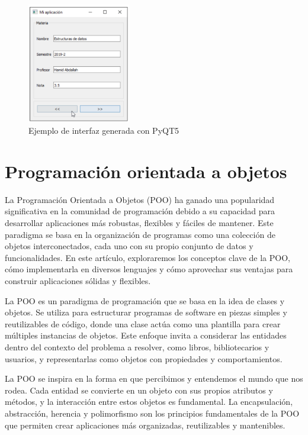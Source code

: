 \begin{figure}[h]
	\centering
	\includegraphics[width=0.4\textwidth]{Imagenes/PyQT5_Interfaz}
	\caption{Ejemplo de interfaz generada con PyQT5}
	\label{fig:interfazPYQT5}
\end{figure}

\section{Programación orientada a objetos}
La Programación Orientada a Objetos (POO) ha ganado una popularidad significativa en la comunidad de programación debido a su capacidad para desarrollar aplicaciones más robustas, flexibles y fáciles de mantener. Este paradigma se basa en la organización de programas como una colección de objetos interconectados, cada uno con su propio conjunto de datos y funcionalidades. En este artículo, exploraremos los conceptos clave de la POO, cómo implementarla en diversos lenguajes y cómo aprovechar sus ventajas para construir aplicaciones sólidas y flexibles.

La POO es un paradigma de programación que se basa en la idea de clases y objetos. Se utiliza para estructurar programas de software en piezas simples y reutilizables de código, donde una clase actúa como una plantilla para crear múltiples instancias de objetos. Este enfoque invita a considerar las entidades dentro del contexto del problema a resolver, como libros, bibliotecarios y usuarios, y representarlas como objetos con propiedades y comportamientos.

La POO se inspira en la forma en que percibimos y entendemos el mundo que nos rodea. Cada entidad se convierte en un objeto con sus propios atributos y métodos, y la interacción entre estos objetos es fundamental. La encapsulación, abstracción, herencia y polimorfismo son los principios fundamentales de la POO que permiten crear aplicaciones más organizadas, reutilizables y mantenibles.

